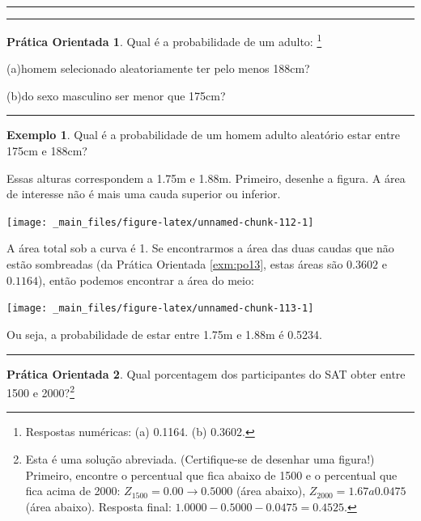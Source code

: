\documentclass[
]{book}
\theoremstyle{definition}
\theoremstyle{definition}
\newtheorem{example}{Exemplo}[chapter]
\theoremstyle{definition}
\newtheorem{exercise}{Prática Orientada}[chapter]
\theoremstyle{definition}
\theoremstyle{remark}
\begin{document}
\begin{center}\rule{0.5\linewidth}{0.5pt}\end{center}

\begin{center}\rule{0.5\linewidth}{0.5pt}\end{center}

\begin{exercise}
\protect\hypertarget{exr:unnamed-chunk-110}{}{\label{exr:unnamed-chunk-110} }
Qual é a probabilidade de um adulto: \footnote{Respostas numéricas: (a) 0.1164. (b) 0.3602.}

(a)homem selecionado aleatoriamente ter pelo menos 188cm?

(b)do sexo masculino ser menor que 175cm?
\end{exercise}

\begin{center}\rule{0.5\linewidth}{0.5pt}\end{center}

\begin{example}
\protect\hypertarget{exm:po13}{}{\label{exm:po13} }Qual é a probabilidade de um homem adulto aleatório estar entre 175cm e 188cm?
\end{example}

Essas alturas correspondem a 1.75m e 1.88m. Primeiro, desenhe a figura. A área de interesse não é mais uma cauda superior ou inferior.

\texttt{[image: \_main\_files/figure-latex/unnamed-chunk-112-1]}

A área total sob a curva é 1. Se encontrarmos a área das duas caudas que não estão sombreadas (da Prática Orientada \ref{exm:po13}, estas áreas são \(0.3602\) e \(0.1164\)), então podemos encontrar a área do meio:

\texttt{[image: \_main\_files/figure-latex/unnamed-chunk-113-1]}

Ou seja, a probabilidade de estar entre 1.75m e 1.88m é 0.5234.

\begin{center}\rule{0.5\linewidth}{0.5pt}\end{center}

\begin{exercise}
\protect\hypertarget{exr:unnamed-chunk-114}{}{\label{exr:unnamed-chunk-114} }Qual porcentagem dos participantes do SAT obter entre 1500 e 2000?\footnote{Esta é uma solução abreviada. (Certifique-se de desenhar uma figura!) Primeiro, encontre o percentual que fica abaixo de 1500 e o percentual que fica acima de 2000: \(Z_{1500} = 0.00 \to 0.5000\) (área abaixo), \(Z_{2000} = 1.67 a 0.0475\) (área abaixo). Resposta final: \(1.0000-0.5000 - 0.0475 = 0.4525\).}
\end{exercise}
\end{document}
